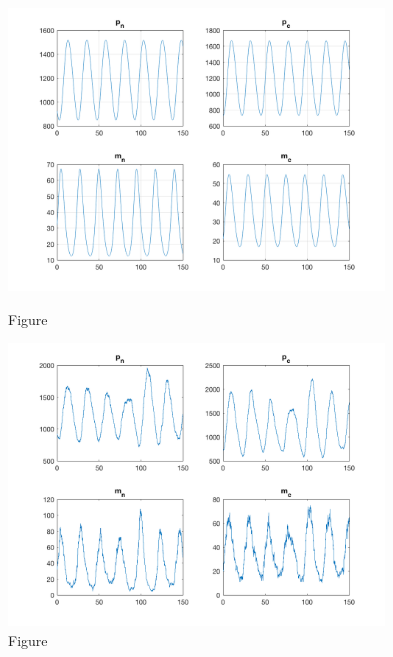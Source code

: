 \documentclass[12pt]{article}
\renewcommand{\(}{\left (}
\renewcommand{\)}{\right )}
\begin{document}
\begin{figure}[h]
    \centering
	\begin{minipage}{0.45\textwidth}
		\centering
		\includegraphics[width=0.89\textwidth]{single_oscillator_zoom_out.png}
		\caption*{\small Figure}
	\end{minipage}
	\begin{minipage}{0.45\textwidth}
		\centering
		\includegraphics[width=0.89\textwidth]{sto_single_oscillator_zoom_out.png}
		\caption*{\small Figure}
	\end{minipage}
\end{figure}
\end{document}
